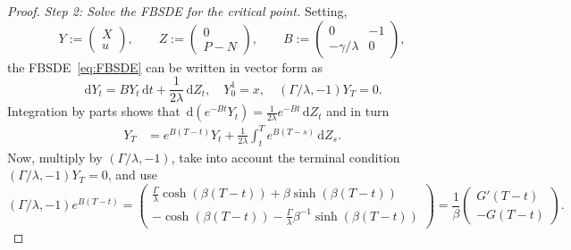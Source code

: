 \documentclass[11pt]{article}
\theoremstyle{definition}
\theoremstyle{remark}
\newcommand{\de}{\,\mathrm{d}}
\begin{document}
\begin{proof}
\emph{Step 2: Solve the FBSDE for the critical point.} 
Setting,
\[
 Y:=\begin{pmatrix} X \\ u\end{pmatrix},\qquad Z:=\begin{pmatrix} 0 \\ P-N\end{pmatrix},\qquad B:=\begin{pmatrix} 0 & -1 \\ -\gamma/\lambda & 0\end{pmatrix},
\]
the FBSDE~\eqref{eq:FBSDE} can be written in vector form as 
\[
\de Y_t = B Y_t \de t + \frac{1}{2\lambda}\de Z_t, \quad Y^1_0=x, \quad (\Gamma/\lambda, -1)Y_T = 0.
\]
Integration by parts shows that $\de (e^{-B t}Y_t)=\frac{1}{2\lambda}e^{-B t}\de Z_t$ and in turn
\begin{align*}
Y_T &= e^{B(T-t)}Y_t+\frac{1}{2\lambda}\int_t^T e^{B(T-s)}\de Z_s.%
\end{align*}
Now, multiply by $(\Gamma/\lambda,-1)$, take into account the terminal condition $(\Gamma/\lambda, -1)Y_T = 0$, and use  
$$
(\Gamma/\lambda, -1)e^{B(T-t)}=\begin{pmatrix} \frac{\Gamma}{\lambda}\cosh(\beta (T-t))+\beta \sinh(\beta(T-t)) \\ -\cosh(\beta(T-t))-\frac{\Gamma}{\lambda}\beta^{-1} \sinh(\beta(T-t))\end{pmatrix}=\frac{1}{\beta}\begin{pmatrix} G'(T-t) \\ -G(T-t) \end{pmatrix}.
$$

\end{proof}
\end{document}
